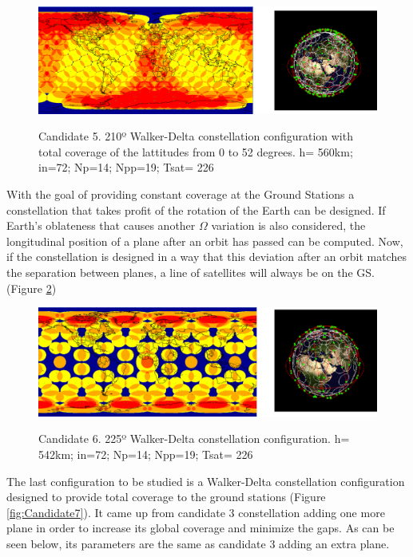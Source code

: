 \begin{figure}[h]%
	\centering
	\includegraphics[width=1\textwidth]{Candidate5.png}\\
	\caption{Candidate 5. 210º Walker-Delta constellation configuration with total coverage of the lattitudes from 0 to 52 degrees.
			 h= 560km; in=72; Np=14; Npp=19; Tsat= 226} 
	\label{fig:Candidate5}
\end{figure}


With the goal of providing constant coverage at the Ground Stations a constellation that takes profit of the rotation of the Earth can be designed. If Earth's oblateness that causes another $\Omega$ variation  is also considered, the longitudinal position of a plane after an orbit has passed can be computed. Now, if the constellation is designed in a way that this deviation after an orbit matches the separation between planes, a line of satellites will always be on the GS. (Figure \ref{fig:Candidate6})

\begin{figure}[h]%
	\centering
	\includegraphics[width=1\textwidth]{Candidate6.png}\\
	\caption{Candidate 6. 225º Walker-Delta constellation configuration. h= 542km; in=72; Np=14; Npp=19; Tsat= 226}
	\label{fig:Candidate6}
\end{figure}


The last configuration to be studied is a Walker-Delta constellation configuration designed to provide total coverage to the ground stations (Figure \ref{fig:Candidate7}). It came up from candidate 3 constellation adding one more plane in order to increase its global coverage and minimize the gaps. As can be seen below, its parameters are the same as candidate 3 adding an extra plane.

